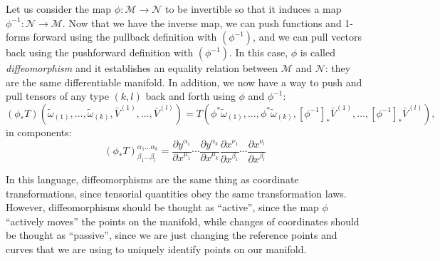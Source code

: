 \documentclass[a4paper]{article}
\begin{document}
Let us consider the map $\phi: \mathcal{M} \rightarrow \mathcal{N}$ to be invertible so that it induces a map $\phi^{-1}: \mathcal{N} \rightarrow \mathcal{M}$. Now that we have the inverse map, we can push functions and 1-forms forward using the pullback definition with $(\phi^{-1})$, and we can pull vectors back using the pushforward definition with $(\phi^{-1})$. In this case, $\phi$ is called \textit{diffeomorphism} and it establishes an equality relation between $\mathcal{M}$ and $\mathcal{N}$: they are the same differentiable manifold. In addition, we now have a way to push and pull tensors of any type $(k,l)$ back and forth using $\phi$ and $\phi^{-1}$:
$$(\phi_* T)(\tilde{\omega}_{(1)}, \ldots, \tilde{\omega}_{(k)}, \bar{V}^{(1)},\ldots, \bar{V}^{(l)}) = T(\phi^*\tilde{\omega}_{(1)}, \ldots, \phi^*\tilde{\omega}_{(k)}, [\phi^{-1}]_* \bar{V}^{(1)},\ldots,[\phi^{-1}]_* \bar{V}^{(l)}),$$
in components:
$$(\phi_* T)^{\alpha_1 \ldots \alpha_k}_{\beta_1 \ldots \beta_l} = \frac{\partial y^{\alpha_1}}{\partial x^{\mu_1}}\cdots\frac{\partial y^{\alpha_k}}{\partial x^{\mu_k}}\frac{\partial x^{\nu_1}}{\partial x^{\beta_1}}\cdots\frac{\partial x^{\nu_l}}{\partial x^{\beta_l}}$$

In this language, diffeomorphisms are the same thing as coordinate transformations, since tensorial quantities obey the same transformation laws. However, diffeomorphisms should be thought as ``active'', since the map $\phi$ ``actively moves'' the points on the manifold, while changes of coordinates should be thought as ``passive'', since we are just changing the reference points and curves that we are using to uniquely identify points on our manifold.
\end{document}
